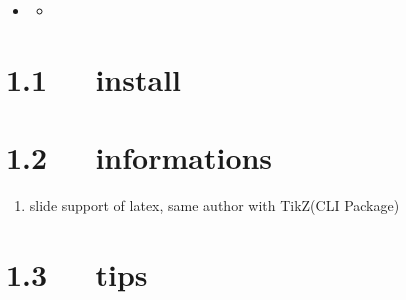 \documentclass[letterpaper,12pt,english]{sphinxmanual}
\begin{document}
\begin{sphinxShadowBox}
\begin{itemize}
\begin{itemize}
\begin{itemize}
\begin{itemize}
\end{itemize}

\item {} 
\label{\detokenize{001software/001install/pandoc:id58}}{\hyperref[\detokenize{001software/001install/pandoc:md2slide}]{}}

\end{itemize}

\item {} 
\label{\detokenize{001software/001install/pandoc:id59}}{\hyperref[\detokenize{001software/001install/pandoc:head}]{}}
\begin{itemize}
\item {} 
\label{\detokenize{001software/001install/pandoc:id60}}{\hyperref[\detokenize{001software/001install/pandoc:rst2pdf-colorlinks}]{}}

\end{itemize}

\end{itemize}

\end{itemize}
\end{sphinxShadowBox}


\section{1.1   install}
\label{\detokenize{001software/001install/pandoc:install}}

\section{1.2   informations}
\label{\detokenize{001software/001install/pandoc:informations}}\begin{enumerate}
%
\item {} 

slide support of latex, same author with TikZ(CLI Package)

\end{enumerate}


\section{1.3   tips}
\label{\detokenize{001software/001install/pandoc:tips}}
\end{document}
